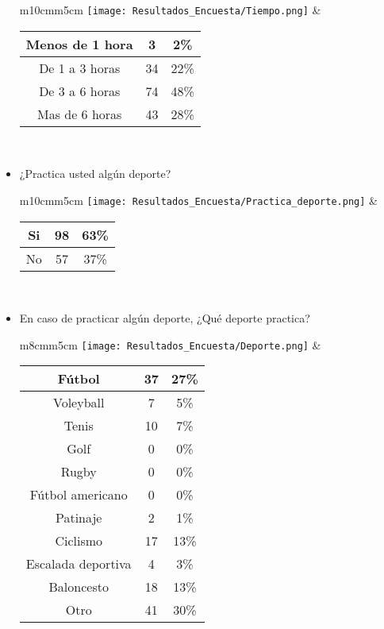 \begin{itemize}
\begin{tabular}{m{10cm}m{5cm}}
        \texttt{[image: Resultados\_Encuesta/Tiempo.png]} &
        \begin{tabular}{|c|cc|}
        \hline
         Menos de 1 hora & 3 & 2\% \\ \hline
         De 1 a 3 horas & 34 & 22\% \\ \hline
         De 3 a 6 horas & 74 & 48\% \\ \hline
         Mas de 6 horas & 43 & 28\% \\ \hline
        \end{tabular} \\
      \end{tabular}
  \item ¿Practica usted algún deporte? \\
  \begin{tabular}{m{10cm}m{5cm}}
        \texttt{[image: Resultados\_Encuesta/Practica\_deporte.png]} &
        \begin{tabular}{|c|cc|}
        \hline
         Si & 98 & 63\% \\ \hline
         No & 57 & 37\% \\ \hline
        \end{tabular} \\
      \end{tabular}
  \item En caso de practicar algún deporte, ¿Qué deporte practica? \\
      \begin{tabular}{m{8cm}m{5cm}}
        \texttt{[image: Resultados\_Encuesta/Deporte.png]} &
        \begin{tabular}{|c|cc|}
        \hline
         Fútbol & 37 & 27\% \\ \hline
         Voleyball & 7 & 5\% \\ \hline
         Tenis & 10 & 7\% \\ \hline
         Golf & 0 & 0\% \\ \hline
         Rugby & 0 & 0\% \\ \hline
         Fútbol americano & 0 & 0\% \\ \hline
         Patinaje & 2 & 1\% \\ \hline
         Ciclismo & 17 & 13\% \\ \hline
         Escalada deportiva & 4 & 3\% \\ \hline
         Baloncesto & 18 & 13\% \\ \hline
         Otro & 41 & 30\% \\ \hline
        \end{tabular} \\

\end{tabular}
\end{itemize}
